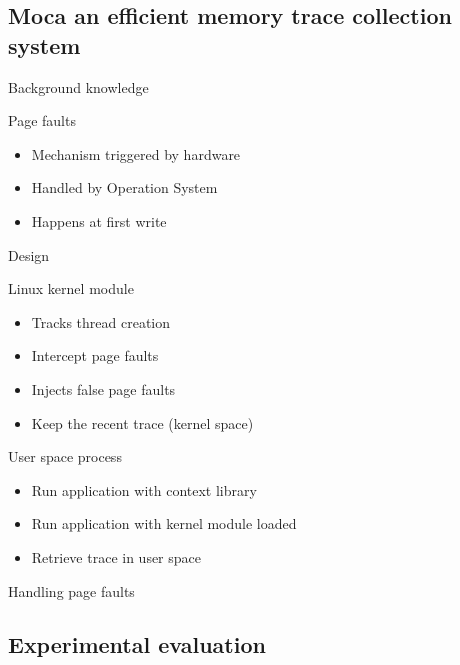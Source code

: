 \documentclass[xcolor={usenames,dvipsnames},hyperref={pdfusetitle}]{beamer}
\begin{document}
\subsection{Moca an efficient memory trace collection system}

\begin{frame}{Background knowledge}
    \begin{block}{Page faults}
        \begin{itemize}
            \item Mechanism triggered by hardware
            \item Handled by Operation System
            \item Happens at first write
        \end{itemize}
    \end{block}
\end{frame}

\begin{frame}{Design}
    \begin{alertblock}{Linux kernel module}
        \begin{itemize}
            \item Tracks thread creation
            \item Intercept page faults
            \item Injects false page faults
            \item Keep the recent trace (kernel space)
        \end{itemize}
    \end{alertblock}
    \pause
    \begin{block}{User space process}
        \begin{itemize}
            \item Run application with context library
            \item Run application with kernel module loaded
            \item Retrieve trace in user space
        \end{itemize}
    \end{block}
\end{frame}

\begin{frame}{Handling page faults}
    \centering
    \resizebox{!}{.7\textheight}{
        
    }
\end{frame}

\subsection{Experimental evaluation}
\end{document}
